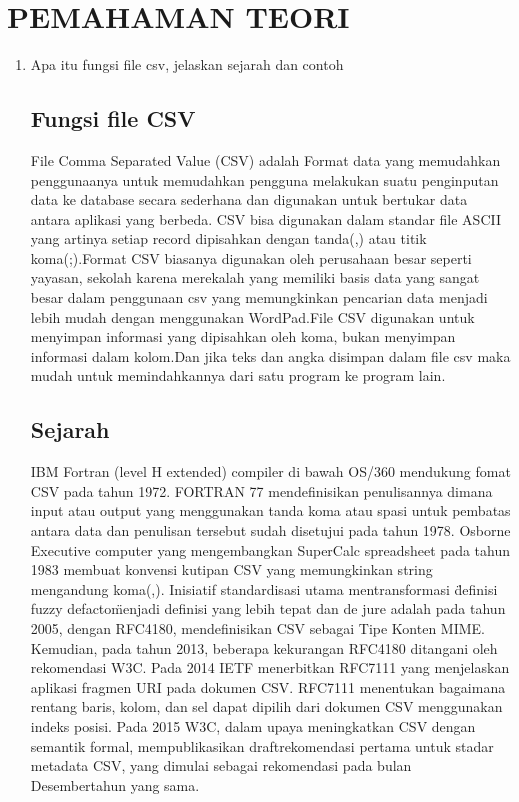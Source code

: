 \documentclass[a4paper, 12pt]{article}
\begin{document}
\section{PEMAHAMAN TEORI}
\begin{enumerate}
\item Apa itu fungsi file csv, jelaskan sejarah dan contoh
\subsection{Fungsi file CSV}
File Comma Separated Value (CSV) adalah Format data yang memudahkan penggunaanya untuk memudahkan pengguna melakukan suatu penginputan data ke database secara sederhana dan digunakan untuk bertukar data antara aplikasi yang berbeda. CSV bisa digunakan dalam standar file ASCII yang artinya setiap record dipisahkan dengan tanda(,) atau titik koma(;).Format CSV biasanya digunakan oleh perusahaan besar seperti yayasan, sekolah karena merekalah yang memiliki basis data yang sangat besar dalam penggunaan csv yang memungkinkan pencarian data menjadi lebih mudah dengan menggunakan WordPad.File CSV digunakan untuk menyimpan informasi yang dipisahkan oleh koma, bukan menyimpan informasi dalam kolom.Dan jika teks dan angka disimpan dalam file csv maka mudah untuk memindahkannya dari satu program ke program lain.
\subsection{Sejarah}
	IBM Fortran (level H extended) compiler di bawah OS/360 mendukung fomat CSV pada tahun 1972. FORTRAN 77 mendefinisikan penulisannya dimana input atau output yang menggunakan tanda koma atau spasi untuk pembatas antara data dan penulisan tersebut sudah disetujui pada tahun 1978.
\hfill\break
	Osborne Executive computer yang mengembangkan SuperCalc spreadsheet pada tahun 1983 membuat konvensi kutipan CSV yang memungkinkan string mengandung koma(,).
\hfill\break
	Inisiatif standardisasi utama \- mentransformasi \"definisi fuzzy defacto\" menjadi definisi yang lebih tepat dan de jure \-adalah pada tahun 2005, dengan RFC4180, mendefinisikan CSV sebagai Tipe Konten MIME. Kemudian, pada tahun 2013, beberapa kekurangan RFC4180 ditangani oleh rekomendasi W3C.
\hfill\break
	Pada 2014 IETF menerbitkan RFC7111 yang menjelaskan aplikasi fragmen URI pada dokumen CSV. RFC7111 menentukan bagaimana rentang baris, kolom, dan sel dapat dipilih dari dokumen CSV menggunakan indeks posisi.
\hfill\break
	Pada 2015 W3C, dalam upaya meningkatkan CSV dengan semantik formal, mempublikasikan draftrekomendasi pertama untuk stadar metadata CSV, yang dimulai sebagai rekomendasi pada bulan Desembertahun yang sama.

\end{enumerate}
\end{document}
